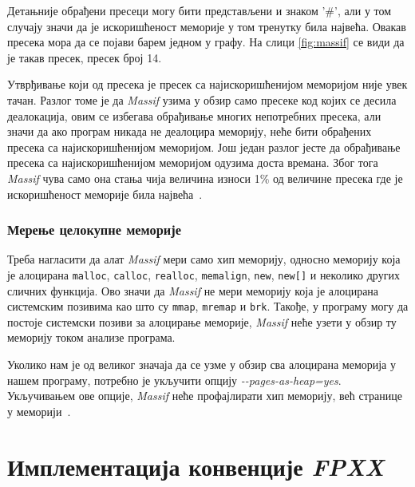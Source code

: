 \documentclass[12pt,oneside]{memoir}
\begin{document}
\indent Детањније обрађени пресеци могу бити представљени и знаком '\#', али у том случају значи да је искоришћеност меморије у том тренутку била највећа. Овакав пресека мора да се појави барем једном у графу. На слици \ref{fig:massif} се види да је такав пресек, пресек број 14.

\indent Утврђивање који од пресека је пресек са најискоришћенијом меморијом није увек тачан. Разлог томе је да \textit{Massif} узима у обзир само пресеке код којих се десила деалокација, овим се избегава обрађивање многих непотребних пресека, али значи да ако програм никада не деалоцира меморију, неће бити обрађених пресека са најискоришћенијом меморијом. Још један разлог јесте да обрађивање пресека са најискоришћенијом меморијом одузима доста времана. Због тога \textit{Massif} чува само она стања чија величина износи 1\% од величине пресека где је искоришћеност меморије била највећа~\cite{massifdRef}.

\subsection{Мерење целокупне меморије}


\indent Треба нагласити да алат \textit{Massif} мери само хип меморију, односно меморију која је алоцирана \texttt{malloc}, \texttt{calloc}, \texttt{realloc}, \texttt{memalign}, \texttt{new}, \texttt{new[]} и неколико других сличних функција. Ово значи да \textit{Massif} не мери меморију која је алоцирана системским позивима као што су \texttt{mmap}, \texttt{mremap} и \texttt{brk}. Такође, у програму могу да постоје системски позиви за алоцирање меморије, \textit{Massif} неће узети у обзир ту меморију током анализе програма.

\indent Уколико нам је од великог значаја да се узме у обзир сва алоцирана меморија у нашем програму, потребно је укључити опцију \textit{-\--pages-as-heap=yes}. Укључивањем ове опције, \textit{Massif} неће профајлирати хип меморију, већ странице у меморији~\cite{massifdRef}.


\chapter{Имплементација конвенције \textit{FPXX}}
\label{chp:fpxx}
\end{document}
